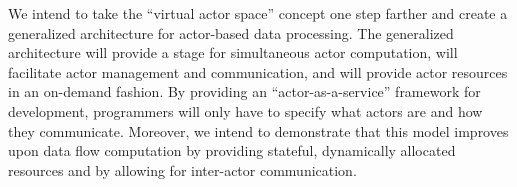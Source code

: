 \documentclass[11pt,letterpaper]{article}
\begin{document}
We intend to take the ``virtual actor space'' concept one step farther and create a generalized architecture for actor-based data processing. The generalized architecture will provide a stage for simultaneous actor computation, will facilitate actor management and communication, and will provide actor resources in an on-demand fashion. By providing an ``actor-as-a-service'' framework for development, programmers will only have to specify what actors are and how they communicate. Moreover, we intend to demonstrate that this model improves upon data flow computation by providing stateful, dynamically allocated resources and by allowing for inter-actor communication.



%
%
\end{document}
